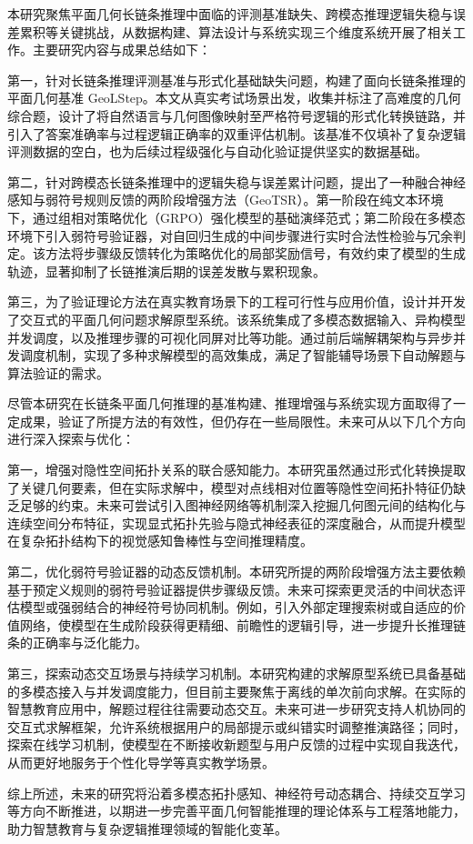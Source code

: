 


本研究聚焦平面几何长链条推理中面临的评测基准缺失、跨模态推理逻辑失稳与误差累积等关键挑战，从数据构建、算法设计与系统实现三个维度系统开展了相关工作。主要研究内容与成果总结如下：

第一，针对长链条推理评测基准与形式化基础缺失问题，构建了面向长链条推理的平面几何基准 GeoLStep。本文从真实考试场景出发，收集并标注了高难度的几何综合题，设计了将自然语言与几何图像映射至严格符号逻辑的形式化转换链路，并引入了答案准确率与过程逻辑正确率的双重评估机制。该基准不仅填补了复杂逻辑评测数据的空白，也为后续过程级强化与自动化验证提供坚实的数据基础。

第二，针对跨模态长链条推理中的逻辑失稳与误差累计问题，提出了一种融合神经感知与弱符号规则反馈的两阶段增强方法（GeoTSR）。第一阶段在纯文本环境下，通过组相对策略优化（GRPO）强化模型的基础演绎范式；第二阶段在多模态环境下引入弱符号验证器，对自回归生成的中间步骤进行实时合法性检验与冗余判定。该方法将步骤级反馈转化为策略优化的局部奖励信号，有效约束了模型的生成轨迹，显著抑制了长链推演后期的误差发散与累积现象。

第三，为了验证理论方法在真实教育场景下的工程可行性与应用价值，设计并开发了交互式的平面几何问题求解原型系统。该系统集成了多模态数据输入、异构模型并发调度，以及推理步骤的可视化同屏对比等功能。通过前后端解耦架构与异步并发调度机制，实现了多种求解模型的高效集成，满足了智能辅导场景下自动解题与算法验证的需求。


尽管本研究在长链条平面几何推理的基准构建、推理增强与系统实现方面取得了一定成果，验证了所提方法的有效性，但仍存在一些局限性。未来可从以下几个方向进行深入探索与优化：

第一，增强对隐性空间拓扑关系的联合感知能力。本研究虽然通过形式化转换提取了关键几何要素，但在实际求解中，模型对点线相对位置等隐性空间拓扑特征仍缺乏足够的约束。未来可尝试引入图神经网络等机制深入挖掘几何图元间的结构化与连续空间分布特征，实现显式拓扑先验与隐式神经表征的深度融合，从而提升模型在复杂拓扑结构下的视觉感知鲁棒性与空间推理精度。

第二，优化弱符号验证器的动态反馈机制。本研究所提的两阶段增强方法主要依赖基于预定义规则的弱符号验证器提供步骤级反馈。未来可探索更灵活的中间状态评估模型或强弱结合的神经符号协同机制。例如，引入外部定理搜索树或自适应的价值网络，使模型在生成阶段获得更精细、前瞻性的逻辑引导，进一步提升长推理链条的正确率与泛化能力。

第三，探索动态交互场景与持续学习机制。本研究构建的求解原型系统已具备基础的多模态接入与并发调度能力，但目前主要聚焦于离线的单次前向求解。在实际的智慧教育应用中，解题过程往往需要动态交互。未来可进一步研究支持人机协同的交互式求解框架，允许系统根据用户的局部提示或纠错实时调整推演路径；同时，探索在线学习机制，使模型在不断接收新题型与用户反馈的过程中实现自我迭代，从而更好地服务于个性化导学等真实教学场景。

综上所述，未来的研究将沿着多模态拓扑感知、神经符号动态耦合、持续交互学习等方向不断推进，以期进一步完善平面几何智能推理的理论体系与工程落地能力，助力智慧教育与复杂逻辑推理领域的智能化变革。